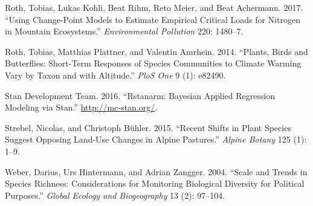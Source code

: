 \documentclass[fleqn,10pt,lineno]{wlpeerj} %
\theoremstyle{definition}
\theoremstyle{definition}
\theoremstyle{definition}
\theoremstyle{remark}
\begin{document}
\hypertarget{ref-Roth2017}{}
Roth, Tobias, Lukas Kohli, Beat Rihm, Reto Meier, and Beat Achermann.
2017. ``Using Change-Point Models to Estimate Empirical Critical Loads
for Nitrogen in Mountain Ecosystems.'' \emph{Environmental Pollution}
220: 1480--7.

\hypertarget{ref-Roth2014}{}
Roth, Tobias, Matthias Plattner, and Valentin Amrhein. 2014. ``Plants,
Birds and Butterflies: Short-Term Responses of Species Communities to
Climate Warming Vary by Taxon and with Altitude.'' \emph{PloS One} 9
(1): e82490.

\hypertarget{ref-Stan2016}{}
Stan Development Team. 2016. ``Rstanarm: Bayesian Applied Regression
Modeling via Stan.'' \url{http://mc-stan.org/}.

\hypertarget{ref-Strebel2015}{}
Strebel, Nicolas, and Christoph Bühler. 2015. ``Recent Shifts in Plant
Species Suggest Opposing Land-Use Changes in Alpine Pastures.''
\emph{Alpine Botany} 125 (1): 1--9.

\hypertarget{ref-Weber2004}{}
Weber, Darius, Urs Hintermann, and Adrian Zangger. 2004. ``Scale and
Trends in Species Richness: Considerations for Monitoring Biological
Diversity for Political Purposes.'' \emph{Global Ecology and
Biogeography} 13 (2): 97--104.
\end{document}
